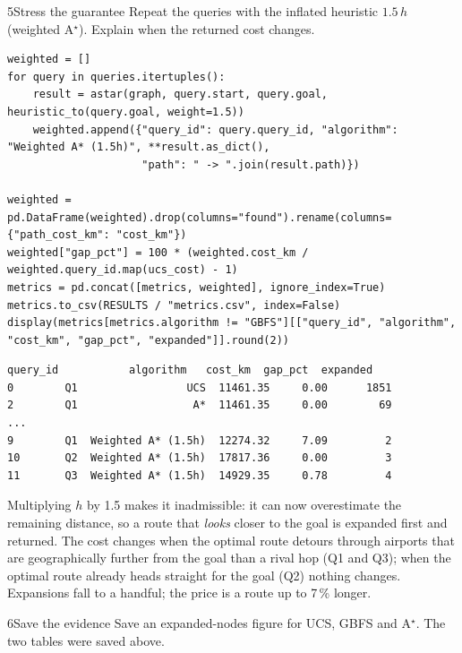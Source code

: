 \begin{labquestion}{5}{Stress the guarantee}
Repeat the queries with the inflated heuristic $1.5\,h$ (weighted A$^\star$). Explain when the returned cost changes.
\end{labquestion}

\begin{labanswer}
\begin{lstlisting}[style=utppython]
weighted = []
for query in queries.itertuples():
    result = astar(graph, query.start, query.goal, heuristic_to(query.goal, weight=1.5))
    weighted.append({"query_id": query.query_id, "algorithm": "Weighted A* (1.5h)", **result.as_dict(),
                     "path": " -> ".join(result.path)})

weighted = pd.DataFrame(weighted).drop(columns="found").rename(columns={"path_cost_km": "cost_km"})
weighted["gap_pct"] = 100 * (weighted.cost_km / weighted.query_id.map(ucs_cost) - 1)
metrics = pd.concat([metrics, weighted], ignore_index=True)
metrics.to_csv(RESULTS / "metrics.csv", index=False)
display(metrics[metrics.algorithm != "GBFS"][["query_id", "algorithm", "cost_km", "gap_pct", "expanded"]].round(2))
\end{lstlisting}
\expectedoutput
\begin{lstlisting}[style=utpterminal]
   query_id           algorithm   cost_km  gap_pct  expanded
0        Q1                 UCS  11461.35     0.00      1851
2        Q1                  A*  11461.35     0.00        69
...
9        Q1  Weighted A* (1.5h)  12274.32     7.09         2
10       Q2  Weighted A* (1.5h)  17817.36     0.00         3
11       Q3  Weighted A* (1.5h)  14929.35     0.78         4
\end{lstlisting}
Multiplying $h$ by 1.5 makes it inadmissible: it can now overestimate the remaining distance, so a route that \emph{looks} closer to the goal is expanded first and returned. The cost changes when the optimal route detours through airports that are geographically further from the goal than a rival hop (Q1 and Q3); when the optimal route already heads straight for the goal (Q2) nothing changes. Expansions fall to a handful; the price is a route up to 7\,\% longer.
\end{labanswer}

\begin{labquestion}{6}{Save the evidence}
Save an expanded-nodes figure for UCS, GBFS and A$^\star$. The two tables were saved above.
\end{labquestion}

